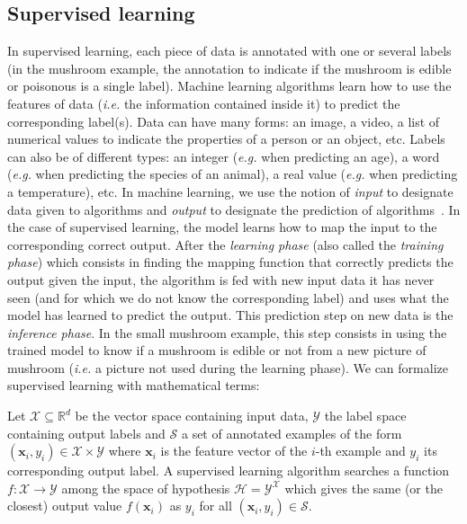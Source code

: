   \subsection{Supervised learning}
    \label{ch02:subsec:supervised-learning}
    In supervised learning, each piece of data is annotated with one or several
    labels (in the mushroom example, the annotation to indicate if the mushroom
    is edible or poisonous is a single label). Machine learning algorithms learn
    how to use the features of data (\textit{i.e.} the information contained
    inside it) to predict the corresponding label(s). Data can have many forms:
    an image, a video, a list of numerical values to indicate the properties of
    a person or an object, etc. Labels can also be of different types: an
    integer (\textit{e.g.} when predicting an age), a word (\textit{e.g.} when
    predicting the species of an animal), a real value (\textit{e.g.} when
    predicting a temperature), etc. In machine learning, we use the notion of
    \textit{input} to designate data given to algorithms and \textit{output} to
    designate the prediction of algorithms~\citep{ayodele2010types}. In the case
    of supervised learning, the model learns how to map the input to the
    corresponding correct output. After the \textit{learning phase} (also
    called the \textit{training phase}) which consists in finding the mapping
    function that correctly predicts the output given the input, the algorithm
    is fed with new input data it has never seen (and for which we do not know
    the corresponding label) and uses what the model has learned to predict the
    output. This prediction step on new data is the \textit{inference
    phase}. In the small mushroom example, this step consists in using the
    trained model to know if a mushroom is edible or not from a new picture of
    mushroom (\textit{i.e.} a picture not used during the learning phase).
    We can formalize supervised learning with mathematical terms:

    \theoremstyle{definition}
    \begin{definition}
      Let $\mathcal{X} \subseteq \mathbb{R}^d$ be the vector space containing
      input data, $\mathcal{Y}$ the label space containing output labels and
      $\mathcal{S}$ a set of annotated examples of the form $(\mathbf{x}_i, y_i)
      \in \mathcal{X} \times \mathcal{Y}$ where $\mathbf{x}_i$ is the feature
      vector of the $i$-th example and $y_i$ its corresponding output label. A
      supervised learning algorithm searches a function $f: \mathcal{X} \to
      \mathcal{Y}$ among the space of hypothesis $\mathcal{H} =
      \mathcal{Y}^\mathcal{X}$ which gives the same (or the closest) output
      value $f(\mathbf{x}_i)$ as $y_i$ for all $(\mathbf{x}_i, y_i) \in
      \mathcal{S}$.
    \end{definition}

